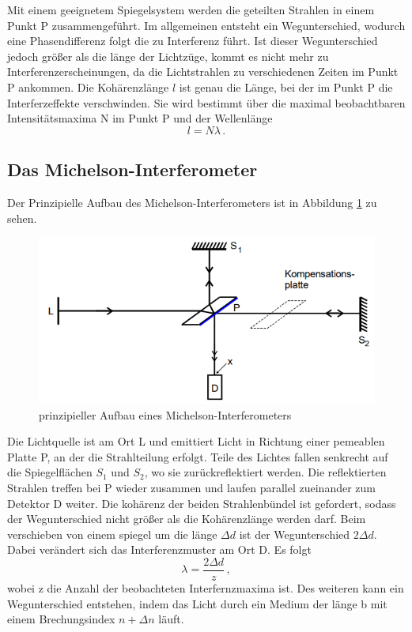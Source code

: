 Mit einem geeignetem Spiegelsystem werden die geteilten Strahlen in einem Punkt P zusammengeführt. Im allgemeinen entsteht ein Wegunterschied, wodurch eine Phasendifferenz folgt die zu Interferenz führt.
Ist dieser Wegunterschied jedoch größer als die länge der Lichtzüge, kommt es nicht mehr zu Interferenzerscheinungen, da die Lichtstrahlen zu verschiedenen Zeiten im Punkt P ankommen.
Die Kohärenzlänge $l$ ist genau die Länge, bei der im Punkt P die Interferzeffekte verschwinden.
Sie wird bestimmt über die maximal beobachtbaren Intensitätsmaxima N im Punkt P und der Wellenlänge 
\begin{equation*}
    l=N \lambda \, .
\end{equation*}
\subsection{Das Michelson-Interferometer}
Der Prinzipielle Aufbau des Michelson-Interferometers ist in Abbildung \ref{fig:mi} zu sehen.
\begin{figure}
    \centering
    \caption{prinzipieller Aufbau eines Michelson-Interferometers \cite{v401}}
    \label{fig:mi}
    \includegraphics[width = 0.5 \textwidth]{pics/michelsoi.png}
\end{figure}
Die Lichtquelle ist am Ort L und emittiert Licht in Richtung einer pemeablen Platte P, an der die Strahlteilung erfolgt.
Teile des Lichtes fallen senkrecht auf die Spiegelflächen $S_1$ und $S_2$, wo sie zurückreflektiert werden. Die reflektierten Strahlen treffen bei P wieder zusammen und laufen parallel zueinander zum Detektor D weiter.
Die kohärenz der beiden Strahlenbündel ist gefordert, sodass der Wegunterschied nicht größer als die Kohärenzlänge werden darf. Beim verschieben von einem spiegel um die länge $\Delta d$ 
ist der Wegunterschied $2 \Delta d$. Dabei verändert sich das Interferenzmuster am Ort D. Es folgt 
\begin{equation}
    \lambda=\frac{2 \Delta d}{z} \, ,
    \label{eqn:wel}
\end{equation}
wobei z die Anzahl der beobachteten Interfernzmaxima ist. Des weiteren kann ein Wegunterschied entstehen, indem das Licht durch ein Medium der länge b mit einem Brechungsindex $n+\Delta n$ läuft.
